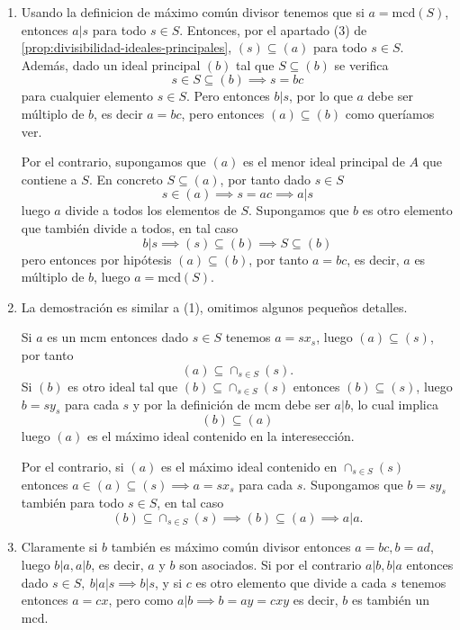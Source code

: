 \begin{proofbox}

\begin{enumerate}
\item Usando la definicion de máximo común divisor tenemos que si \(a = \mathrm{mcd}(S)\), entonces $a | s$ para todo $s\in S$. Entonces, por el apartado (3) de \ref{prop:divisibilidad-ideales-principales}, \((s) \subseteq (a)\) para todo \(s \in S\). Además, dado un ideal principal $(b)$ tal que $S \subseteq (b)$ se verifica
\[
s \in S \subseteq (b) \implies s = bc
\]
para cualquier elemento $s \in S$. Pero entonces $b | s$, por lo que $a$ debe ser múltiplo de $b$, es decir $a = bc$, pero entonces $(a) \subseteq (b)$ como queríamos ver.

Por el contrario, supongamos que \((a)\) es el menor ideal principal de \(A\) que contiene a \(S\). En concreto $S \subseteq (a)$, por tanto dado $s \in S$
\[
s \in (a) \implies s = ac \implies a | s
\]
luego $a$ divide a todos los elementos de $S$. Supongamos que $b$ es otro elemento que también divide a todos, en tal caso 
\[
b | s \implies (s) \subseteq (b) \implies S \subseteq (b)
\]
pero entonces por hipótesis $(a) \subseteq (b)$, por tanto $a = bc$, es decir, $a$ es múltiplo de $b$, luego $a = \mathrm{mcd}(S)$.

\item La demostración es similar a (1), omitimos algunos pequeños detalles.

Si $a$ es un $\text{mcm}$ entonces dado $s \in S$ tenemos $a = sx_s$, luego $(a) \subseteq (s)$, por tanto
\[
(a) \subseteq \cap_{s \in S} (s).
\]
Si $(b)$ es otro ideal tal que $(b) \subseteq \cap_{s \in S} (s)$ entonces $(b) \subseteq (s)$, luego $b = sy_s$ para cada $s$ y por la definición de $\text{mcm}$ debe ser $a | b$, lo cual implica
\[
(b) \subseteq (a)
\]
luego $(a)$ es el máximo ideal contenido en la interesección.

Por el contrario, si $(a)$ es el máximo ideal contenido en $\cap_{s \in S} (s)$ entonces $a \in (a) \subseteq (s) \implies a = sx_s$ para cada $s$. Supongamos que $b = sy_s$ también para todo $s \in S$, en tal caso
\[
(b) \subseteq \cap_{s \in S} (s) \implies (b) \subseteq (a) \implies a | a.
\] 

\item Claramente si $b$ también es máximo común divisor entonces $a = bc, b = ad$, luego $b | a, a | b$, es decir, $a$ y $b$ son asociados. Si por el contrario $a | b, b | a$ entonces dado $s \in S,\ b | a | s \implies b | s$, y si $c$ es otro elemento que divide a cada $s$ tenemos entonces $a = cx$, pero como $a | b \implies b = ay = cxy$ es decir, $b$ es también un $\text{mcd}$.


\end{enumerate}
\end{proofbox}
